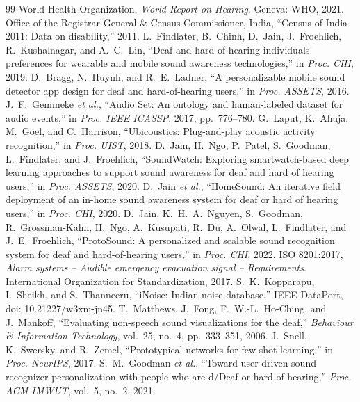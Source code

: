 \documentclass[conference]{IEEEtran}
\begin{document}
\begin{thebibliography}{99}
 World Health Organization, \emph{World Report on Hearing}. Geneva: WHO, 2021.
 Office of the Registrar General \& Census Commissioner, India, ``Census of India 2011: Data on disability,'' 2011.
 L.~Findlater, B.~Chinh, D.~Jain, J.~Froehlich, R.~Kushalnagar, and A.~C.~Lin, ``Deaf and hard-of-hearing individuals' preferences for wearable and mobile sound awareness technologies,'' in \emph{Proc. CHI}, 2019.
 D.~Bragg, N.~Huynh, and R.~E.~Ladner, ``A personalizable mobile sound detector app design for deaf and hard-of-hearing users,'' in \emph{Proc. ASSETS}, 2016.
 J.~F.~Gemmeke \emph{et al.}, ``Audio Set: An ontology and human-labeled dataset for audio events,'' in \emph{Proc. IEEE ICASSP}, 2017, pp.~776--780.
 G.~Laput, K.~Ahuja, M.~Goel, and C.~Harrison, ``Ubicoustics: Plug-and-play acoustic activity recognition,'' in \emph{Proc. UIST}, 2018.
 D.~Jain, H.~Ngo, P.~Patel, S.~Goodman, L.~Findlater, and J.~Froehlich, ``SoundWatch: Exploring smartwatch-based deep learning approaches to support sound awareness for deaf and hard of hearing users,'' in \emph{Proc. ASSETS}, 2020.
 D.~Jain \emph{et al.}, ``HomeSound: An iterative field deployment of an in-home sound awareness system for deaf or hard of hearing users,'' in \emph{Proc. CHI}, 2020.
 D.~Jain, K.~H.~A.~Nguyen, S.~Goodman, R.~Grossman-Kahn, H.~Ngo, A.~Kusupati, R.~Du, A.~Olwal, L.~Findlater, and J.~E.~Froehlich, ``ProtoSound: A personalized and scalable sound recognition system for deaf and hard-of-hearing users,'' in \emph{Proc. CHI}, 2022.
 ISO 8201:2017, \emph{Alarm systems -- Audible emergency evacuation signal -- Requirements}. International Organization for Standardization, 2017.
 S.~K.~Kopparapu, I.~Sheikh, and S.~Thanneeru, ``iNoise: Indian noise database,'' IEEE DataPort, doi: 10.21227/w3xm-jn45.
 T.~Matthews, J.~Fong, F.~W.-L.~Ho-Ching, and J.~Mankoff, ``Evaluating non-speech sound visualizations for the deaf,'' \emph{Behaviour \& Information Technology}, vol.~25, no.~4, pp.~333--351, 2006.
 J.~Snell, K.~Swersky, and R.~Zemel, ``Prototypical networks for few-shot learning,'' in \emph{Proc. NeurIPS}, 2017.
 S.~M.~Goodman \emph{et al.}, ``Toward user-driven sound recognizer personalization with people who are d/Deaf or hard of hearing,'' \emph{Proc. ACM IMWUT}, vol.~5, no.~2, 2021.

\end{thebibliography}
\end{document}
